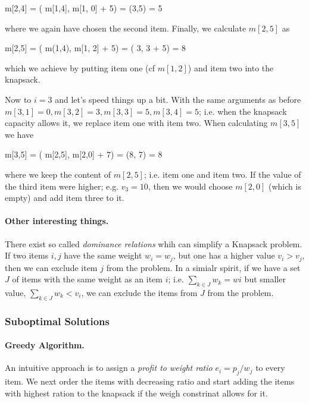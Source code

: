 \bee
m[2,4] = \max( m[1,4], m[1, 0] + 5) = \max(3,5) = 5
\eee

where we again have chosen the second item. Finally, we calculate $m[2,5]$ as

\bee
m[2,5] = \max( m(1,4), m[1, 2] + 5) = \max( 3, 3 + 5) = 8
\eee

which we achieve by putting item one (cf $m[1,2]$) and item two into the knapsack.

Now to $i = 3$ and let's speed things up a bit. With the same arguments as before $m[3,1] = 0, m[3,2] = 3, m[3,3] = 5, m[3,4] = 5$; i.e. when the knapsack capacity allows it, we replace item one with item two. When calculating $m[3,5]$ we have

\bee
m[3,5] = \max( m[2,5], m[2,0] + 7) = \max(8, 7) = 8
\eee

where we keep the content of $m[2,5]$; i.e. item one and item two. If the value of the third item were higher; e.g. $v_3 = 10$, then we would choose $m[2,0]$ (which is empty) and add item three to it.

\paragraph{Other interesting things.} There exist so called \emph{dominance relations} whih can simplify a Knapsack problem. If two items $i, j$ have the same weight $w_i=w_j$, but one has a higher value $v_i > v_j$, then we can exclude item $j$ from the problem. In a simialr spirit, if we have a set $J$ of items with the same weight as an item $i$; i.e. $\sum_{k \in J} w_k = wi$ but smaller value, $\sum_{k \in J} w_k < v_i$, we can exclude the items from $J$ from the problem.



\subsubsection{Suboptimal Solutions}

\paragraph{Greedy Algorithm.} An intuitive approach is to assign a \emph{profit to weight ratio} $e_i = p_j / w_j$ to every item. We next order the items with decreasing ratio and start adding the items with highest ration to the knapsack if the weigh constrinat allows for it.


